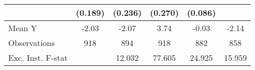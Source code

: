 {\begin{tabular}{l*{5}{c}}
            &     (0.189)         &     (0.236)         &     (0.270)         &     (0.086)         &                     \\
\midrule
Mean Y      &       -2.03         &       -2.07         &        3.74         &       -0.03         &       -2.14         \\
Observations&         918         &         894         &         918         &         882         &         858         \\
Exc. Inst. F-stat&                     &      12.032         &      77.605         &      24.925         &      15.959         \\
\bottomrule
\end{tabular}
}
